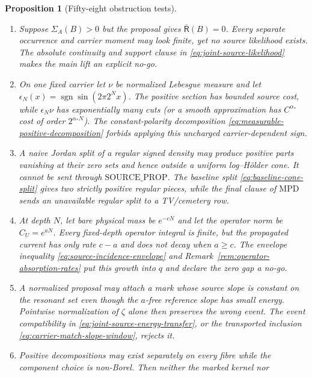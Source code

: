 \documentclass[11pt]{article}
\newtheorem{proposition}[theorem]{Proposition}
\begin{document}
\begin{proposition}[Fifty-eight obstruction tests]
\begin{enumerate}[label=\textup{(T\arabic*)}]
      hide exactly this blow-up.  Equation
      \eqref{eq:selection-safe-likelihood-rates} records it, and
      \eqref{eq:source-value-small-ball} rejects a nonpositive resulting
      gap.
\item Suppose $\Sigma_A(B)>0$ but the proposal gives
      $\overline{\mathsf R}(B)=0$.  Every separate occurrence and carrier
      moment may look finite, yet no source likelihood exists.  The absolute
      continuity and support clause in \eqref{eq:joint-source-likelihood}
      makes the main lift an explicit no-go.
\item On one fixed carrier let $\nu$ be normalized Lebesgue measure and let
      $\epsilon_N(x)=\operatorname{sgn}\sin(2\pi2^Nx)$.  The positive
      section has bounded source cost, while $\epsilon_N\nu$ has
      exponentially many cuts (or a smooth approximation has
      $C^{\alpha_*}$ cost of order $2^{\alpha_*N}$).  The constant-polarity
      decomposition \eqref{eq:measurable-positive-decomposition} forbids
      applying this uncharged carrier-dependent sign.
\item A naive Jordan split of a regular signed density may produce positive
      parts vanishing at their zero sets and hence outside a uniform
      log--H\"older cone.  It cannot be sent through
      $\mathrm{SOURCE\_PROP}$.  The baseline split
      \eqref{eq:baseline-cone-split} gives two strictly positive regular
      pieces, while the final clause of $\mathrm{MPD}$ sends an unavailable
      regular split to a TV/cemetery row.
\item At depth $N$, let bare physical mass be $e^{-cN}$ and let the operator
      norm be $C_U=e^{aN}$.  Every fixed-depth operator integral is finite,
      but the propagated current has only rate $c-a$ and does not decay when
      $a\ge c$.  The envelope inequality
      \eqref{eq:source-incidence-envelope} and
      Remark~\ref{rem:operator-absorption-rates} put this growth into $q$ and
      declare the zero gap a no-go.
\item A normalized proposal may attach a mark whose source slope is constant
      on the resonant set even though the $a$-free reference slope has small
      energy.  Pointwise normalization of $\zeta$ alone then preserves the
      wrong event.  The event compatibility in
      \eqref{eq:joint-source-energy-transfer}, or the transported inclusion
      \eqref{eq:carrier-match-slope-window}, rejects it.
\item Positive decompositions may exist separately on every fibre while the
      component choice is non-Borel.  Then neither the marked kernel nor

\end{enumerate}
\end{proposition}
\end{document}
